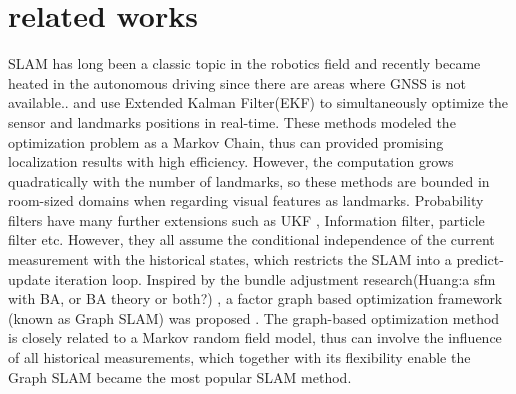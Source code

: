 \documentclass[journal]{IEEEtran}
\begin{document}
\section{related works}
SLAM has long been a classic topic in the robotics field\citep{Cadena:2016fp} and recently became heated in the autonomous driving since there are areas where GNSS is not available.\citep{Bansal2015Analysis}. 
\citet{Davison2003Real} \citet{Davison2007MonoSLAM} and \citet{Civera20101} use Extended Kalman Filter(EKF) to simultaneously optimize the sensor and landmarks positions in real-time. 
These methods modeled the optimization problem as a Markov Chain, thus can provided promising localization results with high efficiency.
However, the computation grows quadratically with the number of landmarks\cite{Bailey2006Simultaneous}, so these methods are bounded in room-sized domains when regarding visual features as landmarks.
Probability filters have many further extensions such as UKF \citep{martinez2005unscented}, Information filter\citep{thrun2005multi}, particle filter\citep{montemerlo2007fastslam}\citep{montemerlo2002fastslam} etc.
However, they all assume the conditional independence of the current measurement with the historical states, which restricts the SLAM into a predict-update iteration loop.
Inspired by the bundle adjustment research(Huang:a sfm with BA, or BA theory or both?) \citep{}, a factor graph based optimization framework (known as Graph SLAM) was proposed \citep{Thrun2006The}.
The graph-based optimization method is closely related to a Markov random field model, thus can involve the influence of all historical measurements, which together with its flexibility enable the Graph SLAM became the most popular SLAM method\citep{why filters}.  

\end{document}
